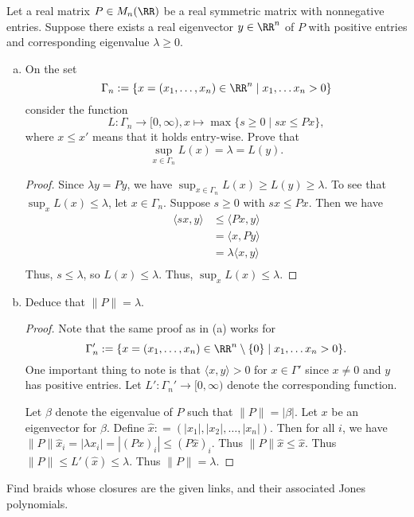 \documentclass{article}
\begin{document}
 Let a real matrix $P \in M_n(\RR)$ be a real symmetric matrix with nonnegative entries.  Suppose there exists a real eigenvector $y \in \RR^n$ of $P$ with positive entries and corresponding eigenvalue $\lambda \ge 0$.
\begin{enumerate}[(a)]
\item On the set
  $$ \Gamma_n := \{ x = (x_1, \ldots, x_n) \in \RR^n \mid x_1, \ldots x_n > 0 \}$$ consider the function
  $$ L : \Gamma_n \to [0, \infty), x \mapsto \max\{s \ge 0 \mid sx \le Px \},$$
  where $x \le x'$ means that it holds entry-wise. Prove that
  $$\sup_{x \in \Gamma_n} L(x) = \lambda = L(y).$$
  \begin{proof}
    Since $\lambda y = Py$, we have $\sup_{x \in \Gamma_n} L(x) \ge L(y) \ge \lambda$.  To see that $\sup_x L(x) \le \lambda$, let $x \in \Gamma_n$.  Suppose $s \ge 0 $ with $sx \le Px$.  Then we have
    \begin{align*}
      \langle sx, y \rangle & \le \langle Px, y \rangle \\
      & = \langle x, P y \rangle \\
      & = \lambda \langle x,  y \rangle \\
    \end{align*}
    Thus, $s \le \lambda$, so $L(x) \le \lambda$.  Thus, $\sup_x L(x) \le \lambda$.     
  \end{proof}

\item Deduce that $\|P \| = \lambda.$
  \begin{proof}
    Note that the same proof as in (a) works for
    $$ \Gamma_n' := \{ x = (x_1, \ldots, x_n) \in \RR^n \setminus \{0\} \mid x_1, \ldots x_n > 0 \}.$$
    One important thing to note is that $\langle x, y \rangle > 0$ for $x \in \Gamma'$ since $x \neq 0$ and $y$ has positive entries. Let $L' : \Gamma_n' \to [0, \infty)$ denote the corresponding function.

      Let $\beta$ denote the eigenvalue of $P$ such that $\|P\| = | \beta |$.  Let $x$ be an eigenvector for $\beta$.  Define $\hat{x}: = (|x_1|, |x_2|, \ldots, |x_n|)$.  Then for all $i$, we have $\|P\| \hat{x}_i = |\lambda x_i| = |(P x)_i|  \le (P \hat{x})_i$.  Thus $\|P\| \hat{x} \le \hat{x}$.  Thus $\|P\| \le L'(\hat{x}) \le \lambda$.  Thus $\|P\| = \lambda$.    
  \end{proof}
\end{enumerate}

 Find braids whose closures are the given links, and their associated Jones polynomials.
\end{document}

